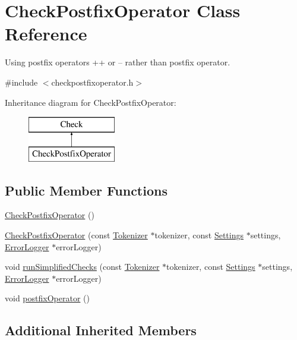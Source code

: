 \hypertarget{class_check_postfix_operator}{\section{Check\-Postfix\-Operator Class Reference}
\label{class_check_postfix_operator}
}


Using postfix operators ++ or -- rather than postfix operator.  




{\ttfamily \#include $<$checkpostfixoperator.\-h$>$}

Inheritance diagram for Check\-Postfix\-Operator\-:\begin{figure}[H]
\begin{center}
\leavevmode
\includegraphics[height=2.000000cm]{class_check_postfix_operator}
\end{center}
\end{figure}
\subsection*{Public Member Functions}
\begin{DoxyCompactItemize}
\item 
\hyperlink{class_check_postfix_operator_a8b1de30dbf6ae286eed3c0e69fe68770}{Check\-Postfix\-Operator} ()
\item 
\hyperlink{class_check_postfix_operator_a1a6c86ba8e434aad1b52bf7335aaca53}{Check\-Postfix\-Operator} (const \hyperlink{class_tokenizer}{Tokenizer} $\ast$tokenizer, const \hyperlink{class_settings}{Settings} $\ast$settings, \hyperlink{class_error_logger}{Error\-Logger} $\ast$error\-Logger)
\item 
void \hyperlink{class_check_postfix_operator_a1cb89c193dd601bbc0e5c976295b16a1}{run\-Simplified\-Checks} (const \hyperlink{class_tokenizer}{Tokenizer} $\ast$tokenizer, const \hyperlink{class_settings}{Settings} $\ast$settings, \hyperlink{class_error_logger}{Error\-Logger} $\ast$error\-Logger)
\item 
void \hyperlink{class_check_postfix_operator_a14d518b2d70795cfe61f7d1b02ae2d43}{postfix\-Operator} ()
\end{DoxyCompactItemize}
\subsection*{Additional Inherited Members}


